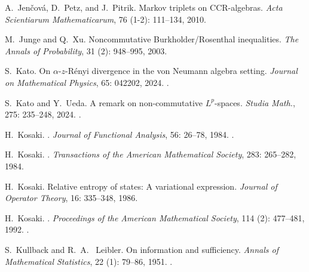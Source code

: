 \documentclass[12pt]{article}
\theoremstyle{definition}
\theoremstyle{remark}
\numberwithin{equation}{section}
\begin{document}
\begin{thebibliography}{27}
A.~Jen{\v c}ov{\'a}, D.~Petz, and J.~Pitrik.
\newblock Markov triplets on CCR-algebras.
\newblock \emph{Acta Scientiarum Mathematicarum}, 76 (1-2):
111--134, 2010.

M.~Junge and Q.~Xu.
\newblock Noncommutative {B}urkholder/{R}osenthal inequalities.
\newblock \emph{The Annals of Probability}, 31 (2): 948--995,
  2003.

S.~Kato.
\newblock On $\alpha $-$ z $-{R}\'enyi divergence in the von {N}eumann algebra
  setting.
\newblock \emph{Journal on Mathematical Physics}, 65: 042202,  2024.
\newblock {}.

S.~Kato and Y.~Ueda.
\newblock A remark on non-commutative {$L^p$}-spaces.
\newblock \emph{Studia Math.}, {275}: 235--248, 2024.
\newblock {}.

H.~Kosaki.
.
\newblock \emph{Journal of Functional Analysis}, {56}: 26--78,
  {1984}{}.
\newblock {}.

H.~Kosaki.
.
\newblock \emph{Transactions of the American Mathematical Society}, {283}: 265--282,
  {1984}{}.

H.~Kosaki.
\newblock Relative entropy of states: A variational expression.
\newblock \emph{Journal of Operator Theory}, 16: 335--348, 1986.

H.~Kosaki.
.
\newblock \emph{Proceedings of the American Mathematical Society}, 114
  (2): 477--481, 1992.
\newblock {}.


S.~Kullback and R.~A.~ Leibler.
\newblock On information and sufficiency.
\newblock \emph{Annals of Mathematical Statistics}, 22 (1):
79--86, 1951.
\newblock {}.



\end{thebibliography}
\end{document}
